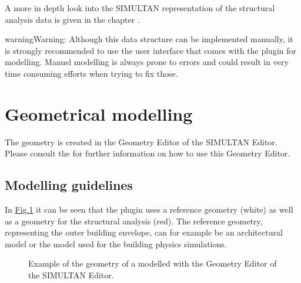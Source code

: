 \documentclass[letterpaper,10pt,english]{jupyterBook}
\let\sphinxpxdimen\pdfpxdimen\else\newdimen\sphinxpxdimen
\begin{document}
\sphinxAtStartPar
A more in depth look into the SIMULTAN representation of the structural analysis data is given in the
chapter {\hyperref[\detokenize{SIMULTAN_Datastructure_to_incorporate_the_RFem_Data_model::doc}]{}}
.

\begin{sphinxadmonition}{warning}{Warning:}
\sphinxAtStartPar
Although this data structure can be implemented manually, it is strongly recommended to use the user interface that
comes with the plugin for modelling. Manuel modelling is always prone to errors and could result in very time
consuming efforts when trying to fix those.
\end{sphinxadmonition}


\section{Geometrical modelling}
\label{\detokenize{Setting_up_a_problem:geometrical-modelling}}
\sphinxAtStartPar
The geometry is created in the Geometry Editor of the SIMULTAN Editor. Please consult
the 
for further information on how to use this Geometry Editor.


\subsection{Modelling guidelines}
\label{\detokenize{Setting_up_a_problem:modelling-guidelines}}
\sphinxAtStartPar
In \hyperref[\detokenize{Setting_up_a_problem:simultan-geometry}]{Fig.\@ \ref{\detokenize{Setting_up_a_problem:simultan-geometry}}} it can be seen that the plugin uses a reference geometry (white) as well as a geometry
for the structural analysis (red). The reference geometry, representing the outer building envelope, can for example be
an architectural model or the model used for the building physics simulations.

\begin{figure}[htbp]
\centering
\capstart

\noindent\sphinxincludegraphics[height=350\sphinxpxdimen]{{simultan_geometry}.png}
\caption{Example of the geometry of a  modelled with the Geometry Editor of the SIMULTAN Editor.}\label{\detokenize{Setting_up_a_problem:simultan-geometry}}\end{figure}
\end{document}
